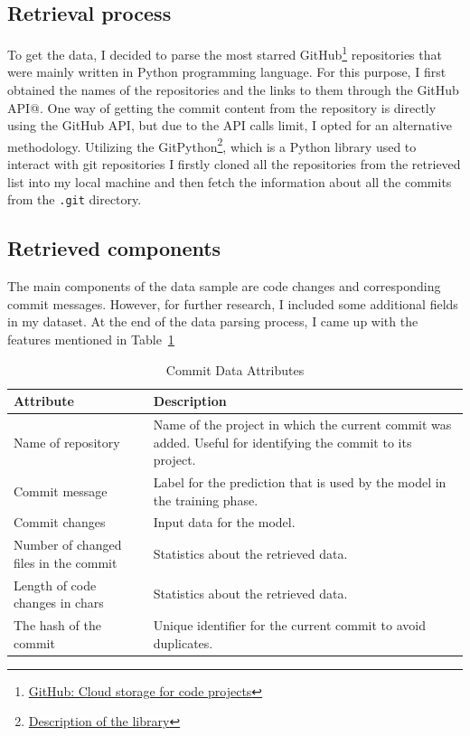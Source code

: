 \subsection{Retrieval process}
 To get the data, I decided to parse the most starred GitHub\footnote[1]{\href{https://github.com}{GitHub: Cloud storage for code projects}} repositories that were mainly written in Python programming language. For this purpose, I first obtained the names of the repositories and the links to them through the GitHub API@. One way of getting the commit content from the repository is directly using the GitHub API, but due to the API calls limit, I opted for an alternative methodology. Utilizing the GitPython\footnote[2]{\href{https://pypi.org/project/GitPython/}{Description of the library}}, which is a Python library used to interact with git repositories I firstly cloned all the repositories from the retrieved list into my local machine and then fetch the information about all the commits from the \texttt{.git} directory. 

 \subsection{Retrieved components}
 The main components of the data sample are code changes and corresponding commit messages. However, for further research, I included some additional fields in my dataset. At the end of the data parsing process, I came up with the features mentioned in Table~{}\ref{table:commit_data_attributes}

{ 
    \renewcommand{\arraystretch}{2} %
    \begin{table}[h]
    \caption{Commit Data Attributes}\label{table:commit_data_attributes}
    \centering
    \begin{tabularx}{\textwidth}{|l|X|} %
    \hline %
    \textbf{Attribute} & \textbf{Description} \\
    \hline %
    Name of repository & Name of the project in which the current commit was added. Useful for identifying the commit to its project. \\
    \hline %
    Commit message & Label for the prediction that is used by the model in the training phase. \\
    \hline %
    Commit changes & Input data for the model. \\
    \hline %
    Number of changed files in the commit & Statistics about the retrieved data. \\
    \hline %
    Length of code changes in chars & Statistics about the retrieved data. \\
    \hline %
    The hash of the commit & Unique identifier for the current commit to avoid duplicates. \\
    \hline %
    \end{tabularx}
\end{table}
}
    
